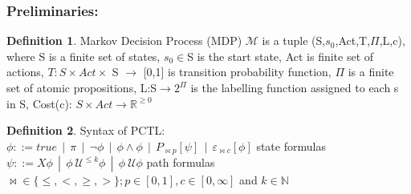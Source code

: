 \documentclass{article}
\theoremstyle{definition}
\newtheorem{definition}{Definition}[section]
\begin{document}
\subsubsection{Preliminaries:}
\theoremstyle{definition}
\begin{definition}{Markov Decision Process (MDP)} $\mathcal{M}$ is a tuple (S,$s_0$,Act,T,$\Pi$,L,c), where S is a finite set of states, $s_0 \in$S is the start state, Act is finite set of actions, $T:S\times Act\times$ S $\rightarrow$ [0,1] is transition probability function, $\Pi$ is a finite set of atomic propositions, L:S$\rightarrow 2^{\Pi}$ is the labelling function assigned to each s in S, Cost(c): $S \times Act \rightarrow \mathbb{R}^{\geq 0}$
\end{definition}

\begin{definition}{Syntax of PCTL:}\\
$\phi ::= true\:\: |\:\: \pi \:\:|\:\: \neg \phi \:\:|\:\: \phi \wedge \phi \:\:|\:\: P_{\Join p}[\psi] \:\:|\:\: \varepsilon_{\Join c}[\phi]$ \hfill state formulas\\
$\psi ::= X\phi \:\: |\:\: \phi\: \mathcal{U}^{\le k}\phi \:\: | \:\: \phi\: \mathcal{U} \phi $ \hfill path formulas\\

$\Join \in \{\le, <, \geq, >\}; p \in [0, 1], c \in [0, \infty]$ and $k \in \mathbb{N}$
\end{definition}
\end{document}
